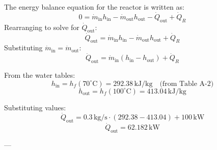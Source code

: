 The energy balance equation for the reactor is written as:  
\[
0 = \dot{m}_{\text{in}} h_{\text{in}} - \dot{m}_{\text{out}} h_{\text{out}} - \dot{Q}_{\text{out}} + \dot{Q}_R
\]  
Rearranging to solve for \( \dot{Q}_{\text{out}} \):  
\[
\dot{Q}_{\text{out}} = \dot{m}_{\text{in}} h_{\text{in}} - \dot{m}_{\text{out}} h_{\text{out}} + \dot{Q}_R
\]  
Substituting \( \dot{m}_{\text{in}} = \dot{m}_{\text{out}} \):  
\[
\dot{Q}_{\text{out}} = \dot{m}_{\text{in}} \left( h_{\text{in}} - h_{\text{out}} \right) + \dot{Q}_R
\]  

From the water tables:  
\[
h_{\text{in}} = h_f(70^\circ\text{C}) = 292.38 \, \text{kJ/kg} \quad \text{(from Table A-2)}
\]  
\[
h_{\text{out}} = h_f(100^\circ\text{C}) = 413.04 \, \text{kJ/kg}
\]  

Substituting values:  
\[
\dot{Q}_{\text{out}} = 0.3 \, \text{kg/s} \cdot \left( 292.38 - 413.04 \right) + 100 \, \text{kW}
\]  
\[
\dot{Q}_{\text{out}} = 62.182 \, \text{kW}
\]  

---